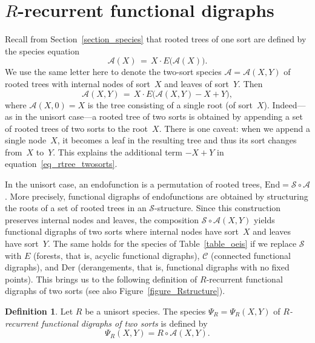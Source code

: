 \documentclass[a4paper,11pt,UKenglish]{article}
\newcommand{\Set}{E}
\newcommand{\Sym}{\mathcal{S}}
\newcommand{\End}{\mathrm{End}}
\newcommand{\Cyc}{\mathcal{C}}
\newcommand{\Der}{\mathrm{Der}}
\newcommand{\rtree}{\mathcal{A}}
\theoremstyle{definition}
\newtheorem{definition}[theorem]{Definition}
\begin{document}
\section{\texorpdfstring{$R$-recurrent functional digraphs}{R-recurrent functional digraphs}}\label{section_Rrecdig}

Recall from Section~\ref{section_species} that rooted trees of one
sort are defined by the species equation
$$
\rtree(X) \,=\, X\cdot\Set\bigl(\rtree(X)\bigr).
$$
We use the same letter here to denote the two-sort species
$\rtree=\rtree(X,Y)$ of rooted trees with internal nodes of sort~$X$
and leaves of sort~$Y$. Then
\begin{equation}\label{eq_rtree_twosorts}
\rtree(X,Y) \,=\, X\cdot\Set\bigl(\rtree(X,Y)-X+Y\bigr),
\end{equation}
where $\rtree(X,0)=X$ is the tree consisting of a single root (of
sort~$X$). Indeed---as in the unisort case---a rooted tree of
two sorts is obtained by appending a set of rooted trees of two
sorts to the root~$X$. There is one caveat: when we append
a single node~$X$, it becomes a leaf in the resulting tree
and thus its sort changes from~$X$ to~$Y$. This explains the
additional term $-X+Y$ in equation~\eqref{eq_rtree_twosorts}.

In the unisort case, an endofunction is a permutation of rooted trees,
$\End=\Sym\circ\rtree$. More precisely, functional digraphs of
endofunctions are obtained by structuring the roots of a set of rooted
trees in an $\Sym$-structure. Since this construction preserves
internal nodes and leaves, the composition
$
\Sym\circ\rtree(X,Y)
$
yields functional digraphs of two sorts where internal nodes have
sort~$X$ and leaves have sort~$Y$. The same holds for the species of
Table~\ref{table_oeis} if we replace $\Sym$ with $\Set$ (forests,
that is, acyclic functional digraphs), $\Cyc$ (connected functional
digraphs), and $\Der$ (derangements, that is, functional digraphs with
no fixed points).
This brings us to the following definition of $R$-recurrent functional
digraphs of two sorts (see also Figure~\ref{figure_Rstructure}).

\begin{definition}
Let $R$ be a unisort species. The species $\Psi_R=\Psi_R(X,Y)$
of \emph{$R$-recurrent functional digraphs of two sorts} is defined by
\begin{equation}\label{PsiR_def}
\Psi_R(X,Y)=R\circ\rtree(X,Y).
\end{equation}
\end{definition}
\end{document}
